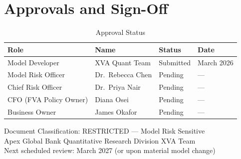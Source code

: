 \documentclass[11pt,a4paper]{article}
\begin{document}
\section{Approvals and Sign-Off}

\begin{table}[h!]
\centering
\caption{Approval Status}
\begin{tabular}{@{}llll@{}}
\toprule
\textbf{Role} & \textbf{Name} & \textbf{Status} & \textbf{Date} \\
\midrule
Model Developer          & XVA Quant Team    & Submitted & March 2026 \\
Model Risk Officer       & Dr.\ Rebecca Chen & Pending   & --- \\
Chief Risk Officer       & Dr.\ Priya Nair   & Pending   & --- \\
CFO (FVA Policy Owner)   & Diana Osei        & Pending   & --- \\
Business Owner           & James Okafor      & Pending   & --- \\
\bottomrule
\end{tabular}
\end{table}

\vspace{1cm}
\noindent\textcolor{apexgray}{\footnotesize
Document Classification: RESTRICTED --- Model Risk Sensitive\\
Apex Global Bank \textbar{} Quantitative Research Division \textbar{} XVA Team\\
Next scheduled review: March 2027 (or upon material model change)
}
\end{document}
